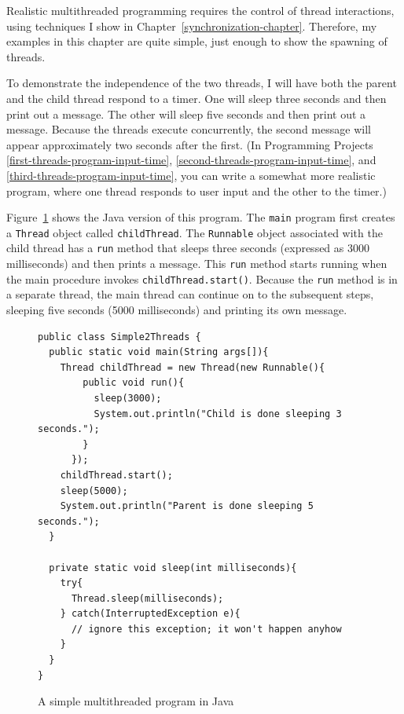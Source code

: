 Realistic multithreaded programming requires the control of thread
interactions, using techniques I show in
Chapter~\ref{synchronization-chapter}.  Therefore, my examples in
this chapter are quite simple, just enough to show the spawning of
threads.

To demonstrate the independence of the two threads, I will have both
the parent and the child thread respond to a timer.  One will sleep
three seconds and then print out a message.  The other will sleep five
seconds and then print out a message.  Because the threads execute
concurrently, the second message will appear approximately two seconds
after the first.  (In Programming Projects
\ref{first-threads-program-input-time},
\ref{second-threads-program-input-time}, and \ref{third-threads-program-input-time},
you can write a somewhat
more realistic program, where one thread responds to user input and
the other to the timer.)

Figure~\ref{Simple2Threads} shows the Java version of this program.
The \verb|main| program first creates a
\verb|Thread| object called
\verb|childThread|.  The
\verb|Runnable| object associated
with the child thread has a \verb|run| method that sleeps three
seconds (expressed as 3000
milliseconds) and then prints a message.  This \verb|run| method starts
running when the main procedure invokes \verb|childThread.start()|.
Because the \verb|run| method is in a separate thread, the main thread
can continue on to the subsequent steps, sleeping five seconds (5000 milliseconds)
and printing its own message.
\begin{figure}
\begin{verbatim}
public class Simple2Threads {
  public static void main(String args[]){
    Thread childThread = new Thread(new Runnable(){
        public void run(){
          sleep(3000);
          System.out.println("Child is done sleeping 3 seconds.");
        }
      });
    childThread.start();
    sleep(5000);
    System.out.println("Parent is done sleeping 5 seconds.");
  }
  
  private static void sleep(int milliseconds){
    try{
      Thread.sleep(milliseconds);
    } catch(InterruptedException e){
      // ignore this exception; it won't happen anyhow
    }
  }
}
\end{verbatim}
\caption{A simple multithreaded program in Java}
\label{Simple2Threads}
\end{figure}

